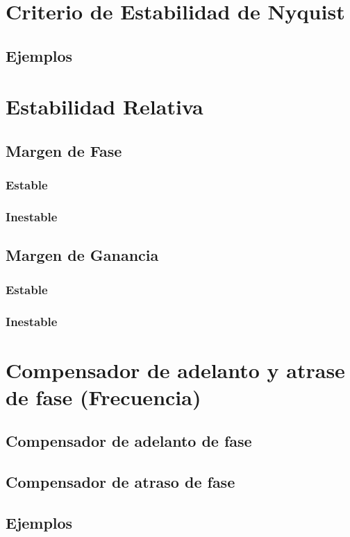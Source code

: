 \newpage
\section{Criterio de Estabilidad de Nyquist}
\subsection{Ejemplos}

\newpage
\section{Estabilidad Relativa}
\subsection{Margen de Fase}
\subsubsection{Estable}
\subsubsection{Inestable}
\subsection{Margen de Ganancia}
\subsubsection{Estable}
\subsubsection{Inestable}

\newpage
\section{Compensador de adelanto y atrase de fase (Frecuencia)}
\subsection{Compensador de adelanto de fase}
\subsection{Compensador de atraso de fase}
\subsection{Ejemplos}

